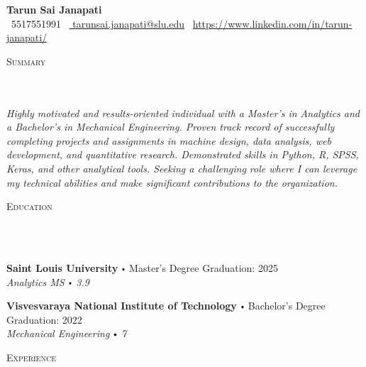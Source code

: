 \documentclass{article}
\newcommand{\school}[4]{
        \textbf{#1} \labelitemi #2 \hfill #3 \\ #4 \vspace*{5pt}
      }
\newcommand{\lineunder}{
        \vspace*{-8pt} \\ \hspace*{-18pt} 
        \hrulefill \\
        }
\newcommand{\header}[1]{{
        \hspace*{-15pt}\vspace*{6pt} \textsc{#1}} \vspace*{-6pt} 
        \lineunder
        }
\renewcommand{\labelitemi}{
        $\vcenter{\hbox{\tiny$\bullet$}}$\hspace*{3pt}
        }
\begin{document}
  
      \small
      \smallskip
      \vspace*{-44pt}
  
      \begin{center}
        {\LARGE \textbf{Tarun Sai Janapati}} \\
        \faPhone\ 5517551991 \quad
        \faEnvelope\ \href{mailto:  tarunsai.janapati@slu.edu}{  tarunsai.janapati@slu.edu} \quad
        \faLinkedin\ \url{https://www.linkedin.com/in/tarun-janapati/}
      \end{center}
     \vspace*{4pt}%
      \header{Summary}
  
      {
        \textit{ Highly motivated and results-oriented individual with a Master's in Analytics and a Bachelor's in Mechanical Engineering. Proven track record of successfully completing projects and assignments in machine design, data analysis, web development, and quantitative research. Demonstrated skills in Python, R, SPSS, Keras, and other analytical tools. Seeking a challenging role where I can leverage my technical abilities and make significant contributions to the organization.}
        }
  
      \vspace{15pt}
  
     \header{Education}
  
      {
        \school{Saint Louis University}{Master's Degree}{Graduation: 2025}{\textit{Analytics MS \labelitemi 3.9}}
        

        \school{Visvesvaraya National Institute of Technology}{Bachelor's Degree}{Graduation: 2022}{\textit{Mechanical Engineering \labelitemi 7}}
        }
  
      \vspace*{4pt}%
      \header{Experience}
  
\end{document}
